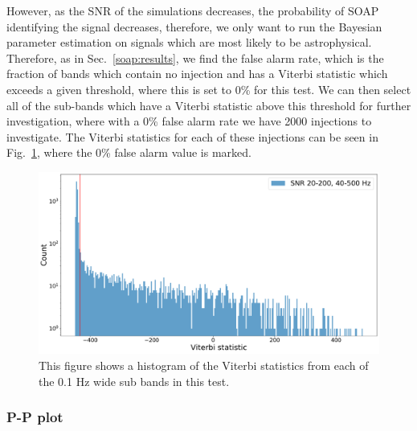 \if
However, as the \gls{SNR} of the simulations decreases, the probability of SOAP identifying the signal decreases, therefore, we only want to run the Bayesian parameter estimation on signals which are most likely to be astrophysical.
Therefore, as in Sec.~\ref{soap:results}, we find the false alarm rate, which is the fraction of bands which contain no injection and has a Viterbi statistic which exceeds a given threshold, where this is set to 0\% for this test.
We can then select all of the sub-bands which have a Viterbi statistic above this threshold for further investigation, where with a 0\% false alarm rate we have 2000  injections to investigate.
The Viterbi statistics for each of these injections can be seen in Fig.~\ref{par_est:results:all_viterbi}, where the 0\% false alarm value is marked.
%
\begin{figure}
    \centering
    \includegraphics[width=\linewidth]{C5_parameter/viterbi_hist.pdf}
    \caption[All Viterbi statistics]{This figure shows a histogram of the Viterbi statistics from each of the 0.1 Hz wide sub bands in this test. }
    \label{par_est:results:all_viterbi}
\end{figure}
\fi


\subsubsection{P-P plot}

